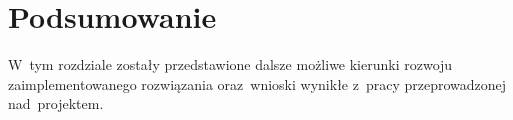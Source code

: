 \documentclass[thesis]{subfiles}
\begin{document}
\chapter{Podsumowanie}

W~tym rozdziale zostały przedstawione dalsze możliwe kierunki rozwoju zaimplementowanego rozwiązania oraz~wnioski wynikłe z~pracy przeprowadzonej nad~projektem.

%
%
\end{document}
